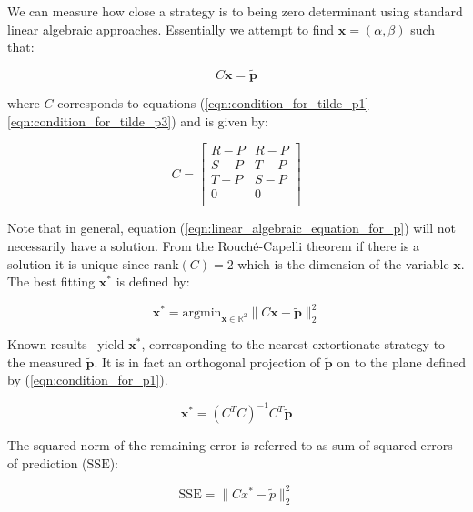 \documentclass[a4paper]{article}
\newcommand{\SSe}{\text{SSE}}
\begin{document}
We can measure how close a strategy is to being zero determinant using standard
linear algebraic approaches. Essentially we attempt to find \(\textbf{x}=(\alpha,
\beta)\) such that:

\begin{equation}\label{eqn:linear_algebraic_equation_for_p}
    C\textbf{x}= \tilde{\textbf{p}}
\end{equation}

where \(C\) corresponds to equations
(\ref{eqn:condition_for_tilde_p1}-\ref{eqn:condition_for_tilde_p3}) and is
given by:

\begin{equation}\label{eqn:definition_of_C}
    C =
    \begin{bmatrix}
        R - P & R- P \\
        S - P & T- P \\
        T - P & S- P \\
        0     & 0 \\
    \end{bmatrix}
\end{equation}

Note that in general, equation (\ref{eqn:linear_algebraic_equation_for_p}) will
not necessarily have a solution. From the Rouch\'{e}-Capelli theorem if there is
a solution it is unique since \(\text{rank}(C)=2\) which is the dimension of the
variable \(\textbf{x}\). The best fitting \(\textbf{x}^*\) is defined by:

\begin{equation}\label{eqn:x_star}
    \textbf{x}^* = \text{argmin}_{\textbf{x}\in\mathbb{R}^2}\|C \textbf{x}- \tilde{\textbf{p}}\|_2^2
\end{equation}

Known results~\cite{kutner2004applied, rao1973linear, wakefield2013bayesian}
yield \(\textbf{x}^*\), corresponding to the nearest extortionate strategy to the measured
\(\tilde{\textbf{p}}\). It is in fact an orthogonal projection of
\(\tilde{\textbf{p}}\) on to the
plane defined by (\ref{eqn:condition_for_p1}).

\begin{equation}\label{eqn:x_star_formula}
    \textbf{x}^* = {\left(C^{T}C\right)}^{-1}C^{T}\tilde{\textbf{p}}
\end{equation}

The squared norm of the remaining error is referred to as sum of squared errors
of prediction (\(\SSe\)):

\begin{equation}\label{eqn:r_squared}
    \SSe = \|C x^*- \tilde p\|_2^2
\end{equation}
\end{document}
